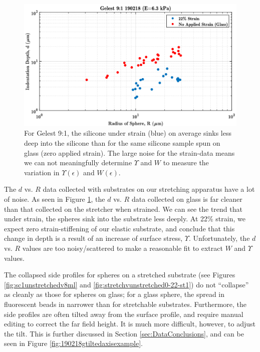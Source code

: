 \begin{figure}[h!]
	\centering
	\includegraphics[width=\linewidth]{Chapters/Figures/g190218_glass_vs_22percent_dvsR.pdf}
	\caption[Glass vs. Stretched d vs. R]{For Gelest 9:1, the silicone under strain (blue) on average sinks less deep into the silicone than for the same silicone sample spun on glass (zero applied strain). The large noise for the strain-data means we can not meaningfully determine $ \Upsilon $ and $ W $ to measure the variation in $ \Upsilon(\epsilon)$ and $W(\epsilon)$.}
	\label{fig:glassvsstretched190218}
\end{figure}

The $ d $ vs. $ R $ data collected with substrates on our stretching apparatus have a lot of noise. As seen in Figure \ref{fig:glassvsstretched190218}, the $ d $ vs. $ R $ data collected on glass is far cleaner than that collected on the stretcher when strained. We can see the trend that under strain, the spheres sink into the substrate less deeply. At 22\% strain, we expect zero strain-stiffening of our elastic substrate, and conclude that this change in depth is a result of an increase of surface stress, $ \Upsilon $. Unfortunately, the $ d $ vs. $ R $ values are too noisy/scattered to make a reasonable fit to extract $ W $ and $ \Upsilon $ values.

The collapsed side profiles for spheres on a stretched substrate (see Figures \ref{fig:sc1unstretchedv8ml} and \ref{fig:stretchvunstretched0-22-st1}) do not ``collapse'' as cleanly as those for spheres on glass; for a glass sphere, the spread in fluorescent beads in narrower than for stretchable substrates. Furthermore, the side profiles are often tilted away from the surface profile, and require manual editing to correct the far field height. It is much more difficult, however, to adjust the tilt. This is further discussed in Section \ref{sec:DataConclusions}, and can be seen in Figure \ref{fig:190218gtiltedaxisexample}.   

